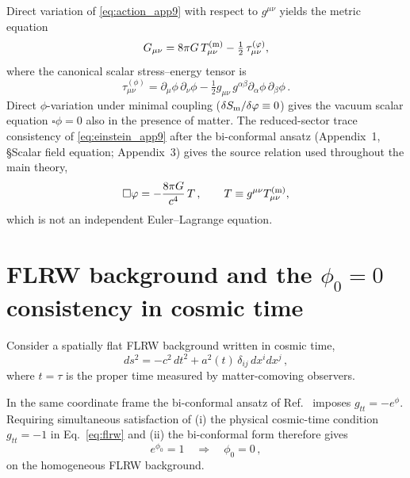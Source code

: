 \documentclass[11pt]{article}
\begin{document}
Direct variation of \eqref{eq:action_app9} with respect to $g^{\mu\nu}$ yields the metric equation
\begin{equation}
G_{\mu\nu} = 8\pi G\,T^{(\rm m)}_{\mu\nu}-\tfrac{1}{2}\,\tau^{(\phi)}_{\mu\nu},
\label{eq:einstein_app9}
\end{equation}
where the canonical scalar stress--energy tensor is
\begin{equation}
\tau^{(\phi)}_{\mu\nu}
= \partial_\mu\phi\,\partial_\nu\phi
-\tfrac{1}{2}g_{\mu\nu}\,g^{\alpha\beta}\partial_\alpha\phi\,\partial_\beta\phi\,.
\label{eq:Tphi_app9}
\end{equation}
Direct $\phi$-variation under minimal coupling ($\delta S_{\rm m}/\delta\phi\equiv 0$) gives the vacuum scalar equation $\square\phi=0$ also in the presence of matter. The reduced-sector trace consistency of \eqref{eq:einstein_app9} after the bi-conformal ansatz (Appendix~1, §Scalar field equation; Appendix~3) gives the source relation used throughout the main theory,
\begin{equation}
\square\phi = -\frac{8\pi G}{c^4}\,T\,,
\qquad T\equiv g^{\mu\nu}T^{(\rm m)}_{\mu\nu},
\label{eq:eoms}
\end{equation}
which is not an independent Euler--Lagrange equation.

\section{FLRW background and the $\phi_0=0$ consistency in cosmic time}
\label{sec:flrw_app9}

Consider a spatially flat FLRW background written in cosmic time,
\begin{equation}
ds^2 = -c^2\,dt^2 + a^2(t)\,\delta_{ij}\,dx^i dx^j\,,
\label{eq:flrw}
\end{equation}
where $t=\tau$ is the proper time measured by matter-comoving observers.

In the same coordinate frame the bi-conformal ansatz of Ref.~\cite{Lotishvili2026}
imposes $g_{tt}=-e^{\phi}$. Requiring simultaneous satisfaction of
(i) the physical cosmic-time condition $g_{tt}=-1$ in Eq.~\eqref{eq:flrw} and
(ii) the bi-conformal form therefore gives
\begin{equation}
e^{\phi_0}=1 \quad\Rightarrow\quad \phi_0=0\,,
\label{eq:phi0}
\end{equation}
on the homogeneous FLRW background.
\end{document}
